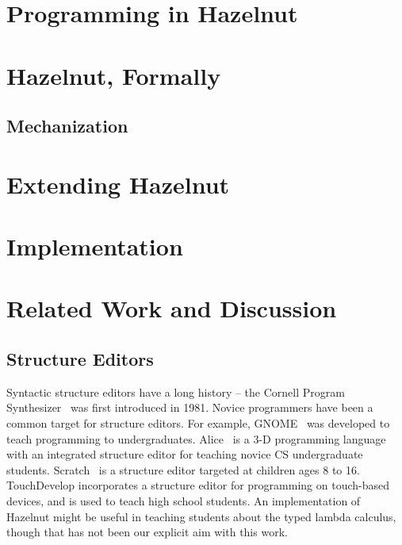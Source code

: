 \documentclass[9pt]{sigplanconf}
\begin{document}
\section{Programming in Hazelnut}\label{sec:example}


\section{Hazelnut, Formally}
\label{sec:hazel}


\subsection{Mechanization}
\label{sec:mech}\label{sec:mt}


\section{Extending Hazelnut}\label{sec:extending}


\section{Implementation}
\label{sec:impl}


\section{Related Work and Discussion}\label{sec:rw}
\subsection{Structure Editors}
Syntactic structure editors have a long history -- the Cornell Program
Synthesizer~\cite{teitelbaum_cornell_1981} was first introduced in
1981. Novice programmers have been a common target for structure
editors. For example, GNOME~\cite{garlan_gnome:_1984} was developed to
teach programming to undergraduates.
Alice~\cite{Conway:2000:ALL:332040.332481} is a 3-D programming language
with an integrated structure editor for teaching novice CS undergraduate
students. Scratch~\cite{Resnick:2009:SP:1592761.1592779} is a structure
editor targeted at children ages 8 to 16.
TouchDevelop \cite{tillmann_touchdevelop:_2011} incorporates a structure
editor for programming on touch-based devices, and is used to teach high
school students. An implementation of Hazelnut might be useful in teaching
students about the typed lambda calculus, though that has not been our
explicit aim with this work.
\end{document}
